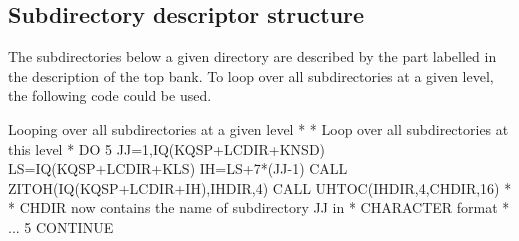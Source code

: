 \subsection*{Subdirectory descriptor structure}
The subdirectories below a given directory are described
by the part labelled  in the description of the top bank.
To loop over all subdirectories at a given level, the following code
could be used.
\begin{XMPt}{Looping over all subdirectories at a given level}
*
*     Loop over all subdirectories at this level
*
         DO 5 JJ=1,IQ(KQSP+LCDIR+KNSD)
            LS=IQ(KQSP+LCDIR+KLS)
            IH=LS+7*(JJ-1)
            CALL ZITOH(IQ(KQSP+LCDIR+IH),IHDIR,4)
            CALL UHTOC(IHDIR,4,CHDIR,16)
*
*     CHDIR now contains the name of subdirectory JJ in
*     CHARACTER format
*
...
   5        CONTINUE
\end{XMPt}

